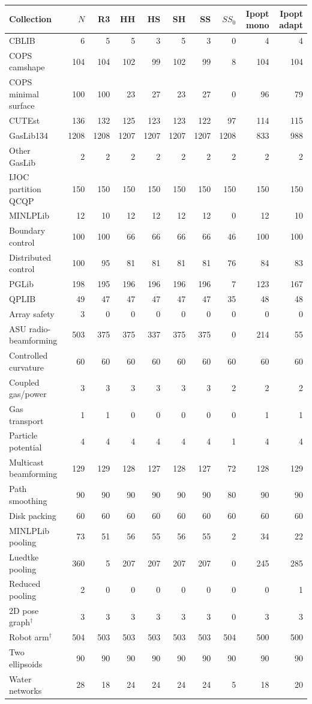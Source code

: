 \begin{tabular}{@{}lrrrrrrrrr@{}}
\toprule
Collection & $N$ & R3 & HH & HS & SH & SS & $SS_0$ & Ipopt mono & Ipopt adapt \\
\midrule
CBLIB & 6 & 5 & 5 & 3 & 5 & 3 & 0 & 4 & 4 \\
COPS camshape & 104 & 104 & 102 & 99 & 102 & 99 & 8 & 104 & 104 \\
COPS minimal surface & 100 & 100 & 23 & 27 & 23 & 27 & 0 & 96 & 79 \\
CUTEst & 136 & 132 & 125 & 123 & 123 & 122 & 97 & 114 & 115 \\
GasLib134 & 1208 & 1208 & 1207 & 1207 & 1207 & 1207 & 1208 & 833 & 988 \\
Other GasLib & 2 & 2 & 2 & 2 & 2 & 2 & 2 & 2 & 2 \\
IJOC partition QCQP & 150 & 150 & 150 & 150 & 150 & 150 & 150 & 150 & 150 \\
MINLPLib & 12 & 10 & 12 & 12 & 12 & 12 & 0 & 12 & 10 \\
Boundary control & 100 & 100 & 66 & 66 & 66 & 66 & 46 & 100 & 100 \\
Distributed control & 100 & 95 & 81 & 81 & 81 & 81 & 76 & 84 & 83 \\
PGLib & 198 & 195 & 196 & 196 & 196 & 196 & 7 & 123 & 167 \\
QPLIB & 49 & 47 & 47 & 47 & 47 & 47 & 35 & 48 & 48 \\
Array safety & 3 & 0 & 0 & 0 & 0 & 0 & 0 & 0 & 0 \\
ASU radio-beamforming & 503 & 375 & 375 & 337 & 375 & 375 & 0 & 214 & 55 \\
Controlled curvature & 60 & 60 & 60 & 60 & 60 & 60 & 60 & 60 & 60 \\
Coupled gas/power & 3 & 3 & 3 & 3 & 3 & 3 & 2 & 2 & 2 \\
Gas transport & 1 & 1 & 0 & 0 & 0 & 0 & 0 & 1 & 1 \\
Particle potential & 4 & 4 & 4 & 4 & 4 & 4 & 1 & 4 & 4 \\
Multicast beamforming & 129 & 129 & 128 & 127 & 128 & 127 & 72 & 128 & 129 \\
Path smoothing & 90 & 90 & 90 & 90 & 90 & 90 & 80 & 90 & 90 \\
Disk packing & 60 & 60 & 60 & 60 & 60 & 60 & 60 & 60 & 60 \\
MINLPLib pooling & 73 & 51 & 56 & 55 & 56 & 55 & 2 & 34 & 22 \\
Luedtke pooling & 360 & 5 & 207 & 207 & 207 & 207 & 0 & 245 & 285 \\
Reduced pooling & 2 & 0 & 0 & 0 & 0 & 0 & 0 & 0 & 1 \\
2D pose graph$^\dagger$ & 3 & 3 & 3 & 3 & 3 & 3 & 0 & 3 & 3 \\
Robot arm$^\dagger$ & 504 & 503 & 503 & 503 & 503 & 503 & 504 & 500 & 500 \\
Two ellipsoids & 90 & 90 & 90 & 90 & 90 & 90 & 90 & 90 & 90 \\
Water networks & 28 & 18 & 24 & 24 & 24 & 24 & 5 & 18 & 20 \\
\bottomrule
\end{tabular}
